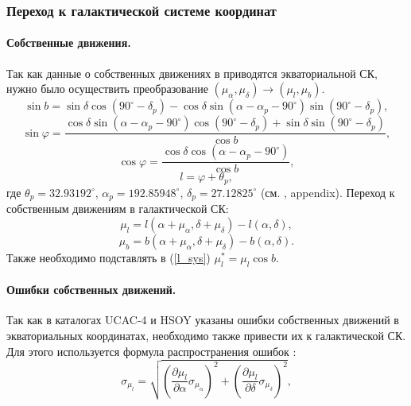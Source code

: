 \documentclass{matmex-diploma-custom}
\begin{document}
\pagebreak
\subsubsection{Переход к галактической системе координат}
\par \paragraph{Собственные движения.} 
Так как данные о собственных движениях в приводятся экваториальной СК, нужно было осуществить преобразование $(\mu_{\alpha}, \mu_{\delta}) \rightarrow (\mu_l, \mu_b)$.
\begin{equation}
        \sin{b} = \sin{\delta} \cos(90^{\circ} - \delta_p) - \cos{\delta} \sin(\alpha - \alpha_p - 90^{\circ}) \sin(90^{\circ} - \delta_p),
\end{equation}
\begin{equation}
        \sin{\varphi} = \frac{\cos{\delta} \sin(\alpha - \alpha_p - 90^{\circ}) \cos(90^{\circ} - \delta_p) + \sin{\delta} \sin(90^{\circ} - \delta_p)}{\cos{b}},
\end{equation}
\begin{equation}
        \cos{\varphi} = \frac{ \cos{\delta} \cos(\alpha - \alpha_p - 90^{\circ})}{\cos{b}},
\end{equation}
\begin{equation}
        l = \varphi + \theta_p,
\end{equation}
где $\theta_p = 32.93192^{\circ}$, $\alpha_p = 192.85948^{\circ}$, $\delta_p = 27.12825^{\circ}$ (см. \cite{ReidSolo}, appendix). Переход к собственным движениям в галактической СК:
\begin{equation}
        \mu_l = l(\alpha + \mu_{\alpha}, \delta + \mu_{\delta}) - l(\alpha, \delta),
\end{equation}
\begin{equation}
        \mu_b = b(\alpha + \mu_{\alpha}, \delta + \mu_{\delta}) - b(\alpha, \delta).
\end{equation}
Также необходимо подставлять в (\ref{l_sys}) $\mu_l^* = \mu_l \cos{b}$.

\pagebreak
\par \paragraph{Ошибки собственных движений.} 
\par Так как в каталогах UCAC-4 и HSOY указаны ошибки собственных движений в экваториальных координатах, необходимо также привести их к галактической СК. Для этого используется формула распространения ошибок \cite{Agekyan}:
\begin{equation}
        \sigma_{\mu_l} = \sqrt{\left(\frac{\partial \mu_l}{\partial \alpha} \sigma_{\mu_{\alpha}} \right)^2 + \left(\frac{\partial \mu_l}{\partial\delta} \sigma_{\mu_{\delta}} \right)^2},
\end{equation}
\end{document}
